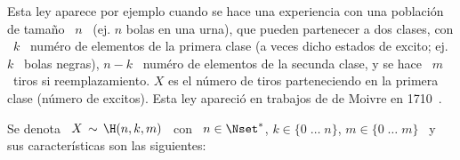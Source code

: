 \label{Sssec:MP:Hipergeometrica}

Esta ley aparece por ejemplo cuando  se hace una experiencia con una poblaci\'on
de tama\~no \  $n$ \ (ej.  $n$ bolas  en una urna), que pueden  partenecer a dos
clases, con  \ $k$ \ num\'ero  de elementos de  la primera clase (a  veces dicho
estados de excito; ej. $k$ \ bolas  negras), $n-k$ \ num\'ero de elementos de la
secunda clase, y se  hace \ $m$ \ tiros si reemplazamiento.   $X$ es el n\'umero
de  tiros parteneciendo  en la  primera clase  (n\'umero de  excitos).  Esta ley
apareci\'o en trabajos de de Moivre en 1710~\cite{Moi10, Hal90, DavEdw01}.

Se denota \ $X \, \sim \, \H(n,k,m)$ \  con \ $n \in \Nset^*$, \quad $k \in \{ 0
\;  \ldots  \;  n  \}$,  \quad  $m  \in  \{  0 \;  \ldots  \;  m  \}$  \  y  sus
caracter\'isticas son las siguientes:

